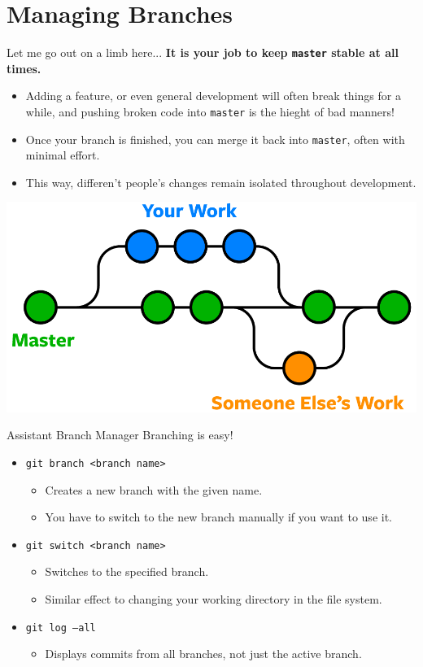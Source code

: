 \documentclass[11pt]{beamer}
\begin{document}
\section[Branches]{Managing Branches}
\begin{frame}{Let me go out on a limb here...}
\textbf{It is your job to keep \texttt{master} stable at all times.} 
\begin{itemize}
\item Adding a feature, or even general development will often break things for a while, and pushing broken code into \texttt{master} is the hieght of bad manners! 
\item Once your branch is finished, you can merge it back into \texttt{master}, often with minimal effort.
\item This way, differen't people's changes remain isolated throughout development. 
\end{itemize}
\center
\includegraphics[scale=0.15]{git-branches-merge.png}
\end{frame}

\begin{frame}{Assistant Branch Manager}
Branching is easy!
\begin{itemize}
\item \texttt{git branch <branch name>}
\begin{itemize}
\item Creates a new branch with the given name.
\item You have to switch to the new branch manually if you want to use it.
\end{itemize}
\item \texttt{git switch <branch name>}
\begin{itemize}
\item Switches to the specified branch.  
\item Similar effect to changing your working directory in the file system.  
\end{itemize}
\item \texttt{git log --all} 
\begin{itemize}
\item Displays commits from all branches, not just the active branch.
\end{itemize}
\end{itemize}
\end{frame}
\end{document}
